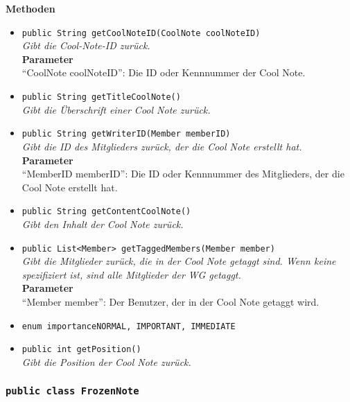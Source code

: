	\textbf{Methoden}
	\begin{itemize}
		\item\texttt{{public String getCoolNoteID(CoolNote coolNoteID)}}\\
		\textit{Gibt die Cool-Note-ID zurück.}\\
		\textbf{Parameter}\\
		“CoolNote coolNoteID”: Die ID oder Kennnummer der Cool Note.\\
		\item\texttt{{public String getTitleCoolNote()}}\\
		\textit{Gibt die Überschrift einer Cool Note zurück.}\\
		\item\texttt{{public String getWriterID(Member memberID)}}\\
		\textit{Gibt die ID des Mitglieders zurück, der die Cool Note erstellt hat.}\\
		\textbf{Parameter}\\
		“MemberID memberID”: Die ID oder Kennnummer des Mitglieders, der die Cool Note erstellt hat.\\
		
		\item\texttt{{public String getContentCoolNote()}}\\
		\textit{Gibt den Inhalt der Cool Note zurück.}\\
		\item\texttt{{public List<Member> getTaggedMembers(Member member)}}\\
		\textit{Gibt die Mitglieder zurück, die in der Cool Note getaggt sind. Wenn keine spezifiziert ist, sind alle Mitglieder der WG getaggt.}\\
		\textbf{Parameter}\\
		“Member member”: Der Benutzer, der in der Cool Note getaggt wird.\\
		\item\texttt{{enum importance{NORMAL, IMPORTANT, IMMEDIATE}}}\\
		\item\texttt{{public int getPosition()}}\\
		\textit{Gibt die Position der Cool Note zurück.}\\
	\end{itemize}

\subsubsection{\texttt{public class FrozenNote}}

